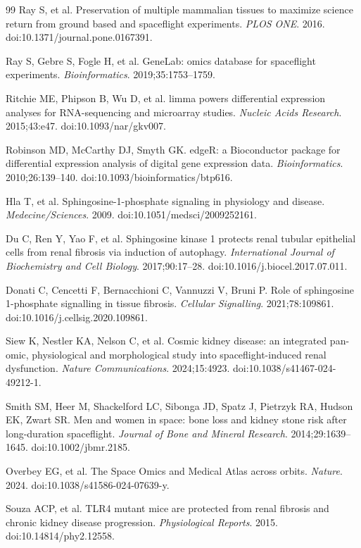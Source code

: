 \documentclass[11pt]{article}
\begin{document}
\begin{thebibliography}{99}
 Ray S, et al. Preservation of multiple mammalian tissues to maximize science return from ground based and spaceflight experiments. \emph{PLOS ONE}. 2016. doi:10.1371/journal.pone.0167391.

 Ray S, Gebre S, Fogle H, et al. GeneLab: omics database for spaceflight experiments. \emph{Bioinformatics}. 2019;35:1753--1759.

 Ritchie ME, Phipson B, Wu D, et al. limma powers differential expression analyses for RNA-sequencing and microarray studies. \emph{Nucleic Acids Research}. 2015;43:e47. doi:10.1093/nar/gkv007.

 Robinson MD, McCarthy DJ, Smyth GK. edgeR: a Bioconductor package for differential expression analysis of digital gene expression data. \emph{Bioinformatics}. 2010;26:139--140. doi:10.1093/bioinformatics/btp616.

 Hla T, et al. Sphingosine-1-phosphate signaling in physiology and disease. \emph{Medecine/Sciences}. 2009. doi:10.1051/medsci/2009252161.

 Du C, Ren Y, Yao F, et al. Sphingosine kinase 1 protects renal tubular epithelial cells from renal fibrosis via induction of autophagy. \emph{International Journal of Biochemistry and Cell Biology}. 2017;90:17--28. doi:10.1016/j.biocel.2017.07.011.

 Donati C, Cencetti F, Bernacchioni C, Vannuzzi V, Bruni P. Role of sphingosine 1-phosphate signalling in tissue fibrosis. \emph{Cellular Signalling}. 2021;78:109861. doi:10.1016/j.cellsig.2020.109861.

 Siew K, Nestler KA, Nelson C, et al. Cosmic kidney disease: an integrated pan-omic, physiological and morphological study into spaceflight-induced renal dysfunction. \emph{Nature Communications}. 2024;15:4923. doi:10.1038/s41467-024-49212-1.

 Smith SM, Heer M, Shackelford LC, Sibonga JD, Spatz J, Pietrzyk RA, Hudson EK, Zwart SR. Men and women in space: bone loss and kidney stone risk after long-duration spaceflight. \emph{Journal of Bone and Mineral Research}. 2014;29:1639--1645. doi:10.1002/jbmr.2185.

 Overbey EG, et al. The Space Omics and Medical Atlas across orbits. \emph{Nature}. 2024. doi:10.1038/s41586-024-07639-y.

 Souza ACP, et al. TLR4 mutant mice are protected from renal fibrosis and chronic kidney disease progression. \emph{Physiological Reports}. 2015. doi:10.14814/phy2.12558.


\end{thebibliography}
\end{document}
